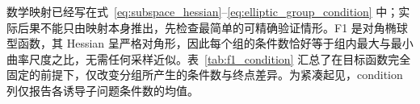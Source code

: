 数学映射已经写在式~\eqref{eq:subspace_hessian}--\eqref{eq:elliptic_group_condition} 中；实际后果不能只由映射本身推出，先检查最简单的可精确验证情形。F1 是对角椭球型函数，其 Hessian 呈严格对角形，因此每个组的条件数恰好等于组内最大与最小曲率尺度之比，无需任何采样近似。表~\ref{tab:f1_condition} 汇总了在目标函数完全固定的前提下，仅改变分组所产生的条件数与终点差异。为紧凑起见，condition 列仅报告各诱导子问题条件数的均值。
